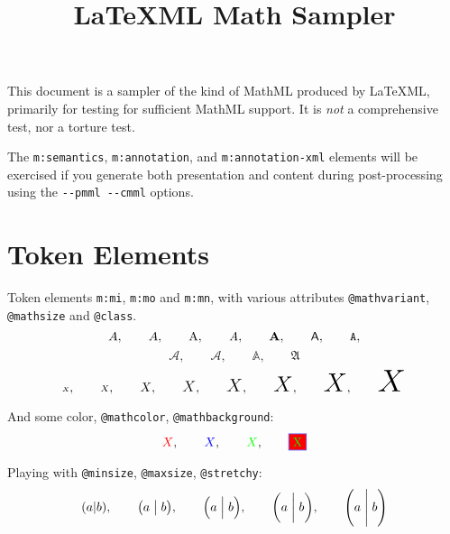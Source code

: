 \documentclass{article}
\title{LaTeXML Math Sampler}
\makeatletter
\newcommand{\mml}[1]{\texttt{m:#1}}
\newcommand{\attr}[1]{\texttt{@#1}}
\newcommand{\mathsized}[2]{\mbox{#1 $#2$}}
\makeatother
\begin{document}
This document is a sampler of the kind of MathML produced by LaTeXML,
primarily for testing for sufficient MathML support.
It is \emph{not} a comprehensive test, nor a torture test.



The \mml{semantics}, \mml{annotation}, and \mml{annotation-xml} elements
will be exercised if you generate both presentation and content during post-processing
using the \verb|--pmml --cmml| options.


\section{Token Elements}
Token elements \mml{mi}, \mml{mo} and \mml{mn}, with various
attributes \attr{mathvariant}, \attr{mathsize} and \attr{class}.
\begin{equation}
 A,\qquad
 \mathnormal{A},\qquad
 \mathrm{A},\qquad
 \mathit{A},\qquad
 \mathbf{A},\qquad
 \mathsf{A},\qquad
 \mathtt{A},
\end{equation}
\begin{equation}
 \mathcal{A},\qquad
 \mathscr{A},\qquad
 \mathbb{A},\qquad
 \mathfrak{A}
\end{equation}
\begin{equation}
 \mathsized{\tiny}{X},\qquad
 \mathsized{\scriptsize}{X},\qquad
 \mathsized{\normalsize}{X},\qquad
 \mathsized{\large}{X},\qquad
 \mathsized{\Large}{X},\qquad
 \mathsized{\LARGE}{X},\qquad
 \mathsized{\huge}{X},\qquad
 \mathsized{\Huge}{X}
\end{equation}

And some color, \attr{mathcolor}, \attr{mathbackground}:
\begin{equation}
  {\color{red} X}, \qquad
  {\color{blue} X}, \qquad
  {\color{green} X}, \qquad
  \fcolorbox{blue}{red}{\textcolor{green}{X}}
\end{equation}

Playing with \attr{minsize}, \attr{maxsize}, \attr{stretchy}:
\begin{equation}
 (a|b),\qquad
 \bigl(a\bigm|b\bigr),\qquad
 \Bigl(a\Bigm|b\Bigr),\qquad
 \biggl(a\biggm|b\biggr),\qquad
 \Biggl(a\Biggm|b\Biggr)
\end{equation}
\end{document}
